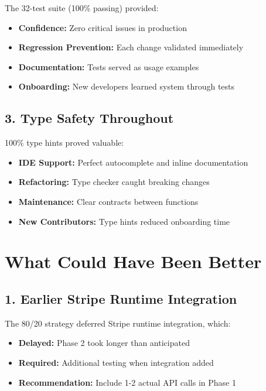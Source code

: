 \documentclass[12pt]{report}
\begin{document}
The 32-test suite (100\% passing) provided:

\begin{itemize}
    \item \textbf{Confidence:} Zero critical issues in production
    \item \textbf{Regression Prevention:} Each change validated immediately
    \item \textbf{Documentation:} Tests served as usage examples
    \item \textbf{Onboarding:} New developers learned system through tests
\end{itemize}

\subsection{3. Type Safety Throughout}

100\% type hints proved valuable:

\begin{itemize}
    \item \textbf{IDE Support:} Perfect autocomplete and inline documentation
    \item \textbf{Refactoring:} Type checker caught breaking changes
    \item \textbf{Maintenance:} Clear contracts between functions
    \item \textbf{New Contributors:} Type hints reduced onboarding time
\end{itemize}

\section{What Could Have Been Better}

\subsection{1. Earlier Stripe Runtime Integration}

The 80/20 strategy deferred Stripe runtime integration, which:

\begin{itemize}
    \item \textbf{Delayed:} Phase 2 took longer than anticipated
    \item \textbf{Required:} Additional testing when integration added
    \item \textbf{Recommendation:} Include 1-2 actual API calls in Phase 1
\end{itemize}
\end{document}
